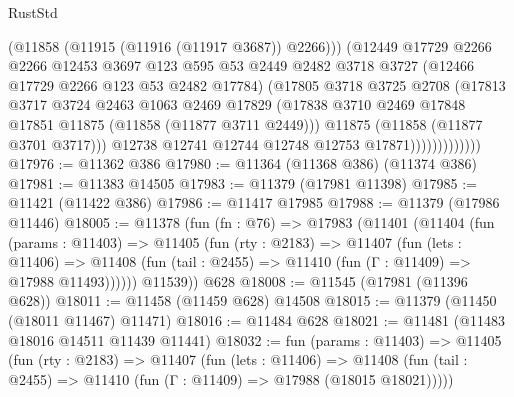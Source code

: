 \begin{lexlean}{RustStd}
\begin{coremodule}
                            (@11858 (@11915 (@11916 (@11917 @3687)) @2266)))
                          (@12449
                            @17729
                            @2266
                            @2266
                            @12453
                            @3697
                            @123
                            @595
                            @53
                            @2449
                            @2482
                            @3718
                            @3727
                            (@12466 @17729 @2266 @123 @53 @2482 @17784)
                            (@17805
                              @3718
                              @3725
                              @2708
                              (@17813
                                @3717
                                @3724
                                @2463
                                @1063
                                @2469
                                @17829
                                (@17838
                                  @3710
                                  @2469
                                  @17848
                                  @17851
                                  @11875
                                  (@11858 (@11877 @3711 @2449)))
                                @11875
                                (@11858 (@11877 @3701 @3717)))
                              @12738
                              @12741
                              @12744
                              @12748
                              @12753
                              @17871)))))))))))))
@17976 := @11362 @386
@17980 := @11364 (@11368 @386) (@11374 @386)
@17981 := @11383 @14505
@17983 := @11379 (@17981 @11398)
@17985 := @11421 (@11422 @386)
@17986 := @11417 @17985
@17988 := @11379 (@17986 @11446)
@18005 := @11378
    (fun (fn : @76) =>
    @17983
      (@11401
        (@11404
          (fun (params : @11403) =>
          @11405
            (fun (rty : @2183) =>
            @11407
              (fun (lets : @11406) =>
              @11408 (fun (tail : @2455) => @11410 (fun (Γ : @11409) => @17988 @11493))))))
        @11539))
    @628
@18008 := @11545 (@17981 (@11396 @628))
@18011 := @11458 (@11459 @628) @14508
@18015 := @11379 (@11450 (@18011 @11467) @11471)
@18016 := @11484 @628
@18021 := @11481 (@11483 @18016 @14511 @11439 @11441)
@18032 := fun (params : @11403) =>
  @11405
    (fun (rty : @2183) =>
    @11407
      (fun (lets : @11406) =>
      @11408 (fun (tail : @2455) => @11410 (fun (Γ : @11409) => @17988 (@18015 @18021)))))

\end{coremodule}
\end{lexlean}
